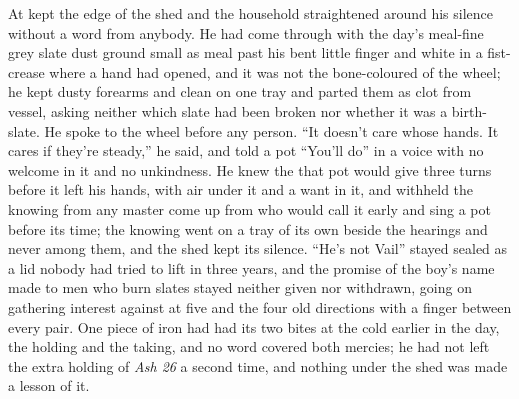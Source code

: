 At   kept the edge of the shed and the household straightened around his silence without a word from anybody. He had come through  with the day's meal-fine grey slate dust ground small as meal past his bent little finger and white in a fist-crease where a hand had opened, and it was not the bone-coloured  of the wheel; he kept dusty forearms and clean on one tray and parted them as clot from vessel, asking neither which slate had been broken nor whether it was a birth-slate. He spoke to the wheel before any person. “It doesn't care whose hands. It cares if they're steady,” he said, and told a pot “You'll do” in a voice with no welcome in it and no unkindness. He knew the  that pot would give three turns before it left his hands, with air under it and a want in it, and withheld the knowing from any master come up from  who would call it early and sing a pot before its time; the knowing went on a tray of its own beside the hearings and never among them, and the shed kept its silence. “He's not Vail” stayed sealed as a lid nobody had tried to lift in three years, and the promise of the boy's name made to men who burn slates stayed neither given nor withdrawn, going on gathering interest against  at five and the four old directions with a finger between every pair. One piece of iron had had its two bites at the cold  earlier in the day, the holding and the taking, and no  word covered both mercies; he had not left the extra holding of \emph{Ash 26} a second time, and nothing under the shed was made a lesson of it.

\scenebreak

